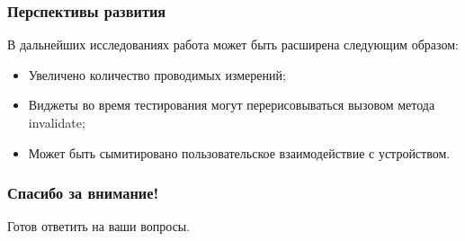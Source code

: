 \documentclass{beamer}
\begin{document}
    \begin{frame}
        \frametitle{Перспективы развития}
        В дальнейших исследованиях работа может быть расширена следующим образом:
        \begin{itemize}
            \item Увеличено количество проводимых измерений; 
            \item Виджеты во время тестирования могут перерисовываться вызовом метода invalidate;
            \item Может быть сымитировано пользовательское взаимодействие с устройством.
        \end{itemize}
    \end{frame}
    \begin{frame}[c]
        \begin{center}
            \frametitle{\LARGE Спасибо за внимание!}

            { \LARGE Готов ответить на ваши вопросы. }
        \end{center}
    \end{frame}
\end{document}
